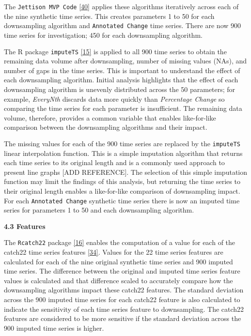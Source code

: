\documentclass{article}
\begin{document}
The \texttt{Jettison\ MVP\ Code}
\protect\hyperlink{ref-Jettison}{{[}40{]}} applies these algorithms
iteratively across each of the nine synthetic time series. This creates
parameters 1 to 50 for each downsampling algorithm and
\texttt{Annotated\ Change} time series. There are now 900 time series
for investigation; 450 for each downsampling algorithm.

The R package \texttt{imputeTS}
\protect\hyperlink{ref-imputeTS_R}{{[}15{]}} is applied to all 900 time
series to obtain the remaining data volume after downsampling, number of
missing values (NAs), and number of gaps in the time series. This is
important to understand the effect of each downsampling algorithm.
Initial analysis highlights that the effect of each downsampling
algorithm is unevenly distributed across the 50 parameters; for example,
\emph{EveryNth} discards data more quickly than \emph{Percentage Change}
so comparing the time series for each parameter is insufficient. The
remaining data volume, therefore, provides a common variable that
enables like-for-like comparison between the downsampling algorithms and
their impact.

The missing values for each of the 900 time series are replaced by the
\texttt{imputeTS} linear interpolation function. This is a simple
imputation algorithm that returns each time series to its original
length and is a commonly used approach to present line graphs {[}ADD
REFERENCE{]}. The selection of this simple imputation function may limit
the findings of this analysis, but returning the time series to their
original length enables a like-for-like comparison of downsampling
impact. For each \texttt{Annotated\ Change} synthetic time series there
is now an imputed time series for parameters 1 to 50 and each
downsampling algorithm.

\textbf{4.3 Features}

The \texttt{Rcatch22} package
\protect\hyperlink{ref-catch22_R}{{[}16{]}} enables the computation of a
value for each of the catch22 time series features
\protect\hyperlink{ref-catch22}{{[}34{]}}. Values for the 22 time series
features are calculated for each of the nine original synthetic time
series and 900 imputed time series. The difference between the original
and imputed time series feature values is calculated and that difference
scaled to accurately compare how the downsampling algorithms impact
these catch22 features. The standard deviation across the 900 imputed
time series for each catch22 feature is also calculated to indicate the
sensitivity of each time series feature to downsampling. The catch22
features are considered to be more sensitive if the standard deviation
across the 900 imputed time series is higher.
\end{document}
